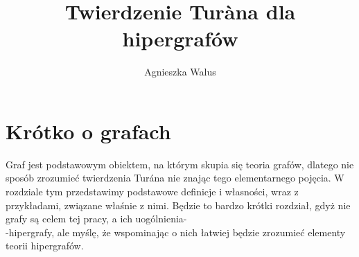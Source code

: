 \documentclass[miz,woman]{mgrwms}
\title{ Twierdzenie Tur\`{a}na dla hipergrafów}
\author{ Agnieszka Walus}
\begin{document}
\newtheorem{defi}{Definicja}[chapter]
\newtheorem{hip}{Hipoteza}[chapter]
\newtheorem{tw}{Twierdzenie}[chapter]
\newtheorem{lem}[tw]{Lemat}
\theoremstyle{definition}
\newtheorem{przy}{Przykład}[chapter]


\chapter{Krótko o grafach}
Graf jest podstawowym obiektem, na którym skupia się teoria grafów, dlatego nie sposób zrozumieć twierdzenia Tur\'ana
 nie znając tego elementarnego pojęcia. W rozdziale tym przedstawimy podstawowe definicje i własności, wraz z przykładami,
 związane właśnie z nimi. Będzie to bardzo krótki rozdział, gdyż nie grafy są celem tej pracy, a ich uogólnienia-\\
-hipergrafy, ale myślę, że wspominając o nich łatwiej będzie zrozumieć elementy teorii hipergrafów.
\\
\end{document}
